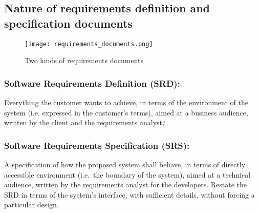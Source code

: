 \subsection{Nature of requirements definition and specification documents}

\begin{figure}[!ht]
    \centering
    \texttt{[image: requirements\_documents.png]}
    \caption{Two kinds of requirements documents}
\end{figure}
\FloatBarrier{}

\subsubsection{Software Requirements Definition (SRD):}
Everything the customer wants to achieve, in terms of the environment of the system (i.e.
expressed in the customer’s terms), aimed at a business audience, written by the client and
the requirements analyst/

\subsubsection{Software Requirements Specification (SRS):}

A specification of how the proposed system shall behave, in terms of directly accessible
environment (i.e.\ the boundary of the system), aimed at a technical audience, written by
the requirements analyst for the developers.
Restate the SRD in terms of the system’s interface, with sufficient details, without forcing a
particular design.
